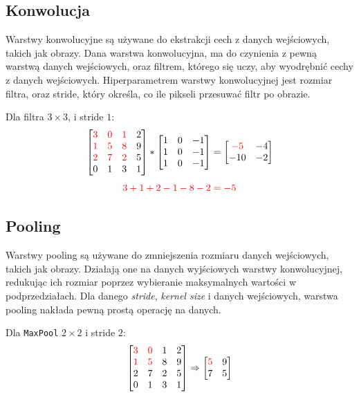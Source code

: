 \documentclass{../notatki}
\begin{document}
\subsection{Konwolucja}

Warstwy konwolucyjne są używane do ekstrakcji cech z danych wejściowych,
takich jak obrazy. Dana warstwa konwolucyjna, ma do czynienia z pewną warstwą
danych wejściowych, oraz filtrem, którego się uczy, aby wyodrębnić cechy z
danych wejściowych. Hiperparametrem warstwy konwolucyjnej jest rozmiar filtra,
oraz stride, który określa, co ile pikseli przesuwać filtr po obrazie.

\begin{examplebox}
  Dla filtra $3\times3$, i stride $1$:
  $$
  \begin{bmatrix}
    \textcolor{red}{3} & \textcolor{red}{0} & \textcolor{red}{1} & 2 \\
    \textcolor{red}{1} & \textcolor{red}{5} & \textcolor{red}{8} & 9 \\
    \textcolor{red}{2} & \textcolor{red}{7} & \textcolor{red}{2} & 5 \\
    0 & 1 & 3 & 1
  \end{bmatrix}
  *
  \begin{bmatrix}
    1 & 0 & -1 \\
    1 & 0 & -1 \\
    1 & 0 & -1
  \end{bmatrix}
  =
  \begin{bmatrix}
    \textcolor{red}{-5} & -4 \\
    -10 & -2
  \end{bmatrix}
  $$
  $$
  \textcolor{red}{3 + 1 + 2 - 1 - 8 - 2 = -5}
  $$
\end{examplebox}

\subsection{Pooling}

Warstwy pooling są używane do zmniejszenia rozmiaru danych wejściowych,
takich jak obrazy. Działają one na danych wyjściowych warstwy konwolucyjnej,
redukując ich rozmiar poprzez wybieranie maksymalnych wartości w
podprzedziałach. Dla danego \textit{stride}, \textit{kernel size} i danych
wejściowych, warstwa pooling nakłada pewną prostą operację na danych.

\begin{examplebox}
  Dla \texttt{MaxPool} $2\times2$ i stride $2$:
  $$
  \begin{bmatrix}
    \textcolor{red}{3} & \textcolor{red}{0} & 1 & 2 \\
    \textcolor{red}{1} & \textcolor{red}{5} & 8 & 9 \\
    2 & 7 & 2 & 5 \\
    0 & 1 & 3 & 1
  \end{bmatrix} \Rightarrow
  \begin{bmatrix}
    \textcolor{red}{5} & 9\\
    7 & 5
  \end{bmatrix}
  $$
\end{examplebox}
\end{document}
